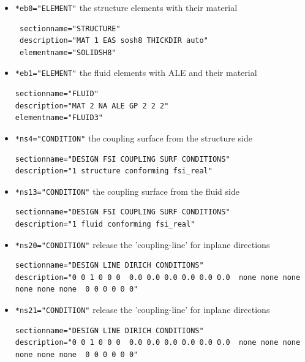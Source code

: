 \begin{itemize}
 \item \verb|*eb0="ELEMENT"| \qquad the structure elements with their material
 \begin{small} \begin{verbatim}
 sectionname="STRUCTURE"
 description="MAT 1 EAS sosh8 THICKDIR auto"
 elementname="SOLIDSH8"
 \end{verbatim} \end{small}
 \item \verb|*eb1="ELEMENT"| \qquad the fluid elements with ALE and their material
 \begin{small} \begin{verbatim}
sectionname="FLUID"
description="MAT 2 NA ALE GP 2 2 2"
elementname="FLUID3"
\end{verbatim} \end{small}
\item \verb|*ns4="CONDITION"|  \qquad the coupling surface from the structure side
\begin{small} \begin{verbatim}
sectionname="DESIGN FSI COUPLING SURF CONDITIONS"
description="1 structure conforming fsi_real"
 \end{verbatim} \end{small}
\item \verb|*ns13="CONDITION"| \qquad the coupling surface from the fluid side
\begin{small} \begin{verbatim}
sectionname="DESIGN FSI COUPLING SURF CONDITIONS"
description="1 fluid conforming fsi_real"
 \end{verbatim} \end{small}
\item \verb|*ns20="CONDITION"| \qquad release the 'coupling-line' for inplane directions
\begin{small} \begin{verbatim}
sectionname="DESIGN LINE DIRICH CONDITIONS"
description="0 0 1 0 0 0  0.0 0.0 0.0 0.0 0.0 0.0  none none none none none none  0 0 0 0 0 0"
 \end{verbatim} \end{small}
\item \verb|*ns21="CONDITION"| \qquad release the 'coupling-line' for inplane directions
\begin{small} \begin{verbatim}
sectionname="DESIGN LINE DIRICH CONDITIONS"
description="0 0 1 0 0 0  0.0 0.0 0.0 0.0 0.0 0.0  none none none none none none  0 0 0 0 0 0"
 \end{verbatim} \end{small}
\end{itemize}

